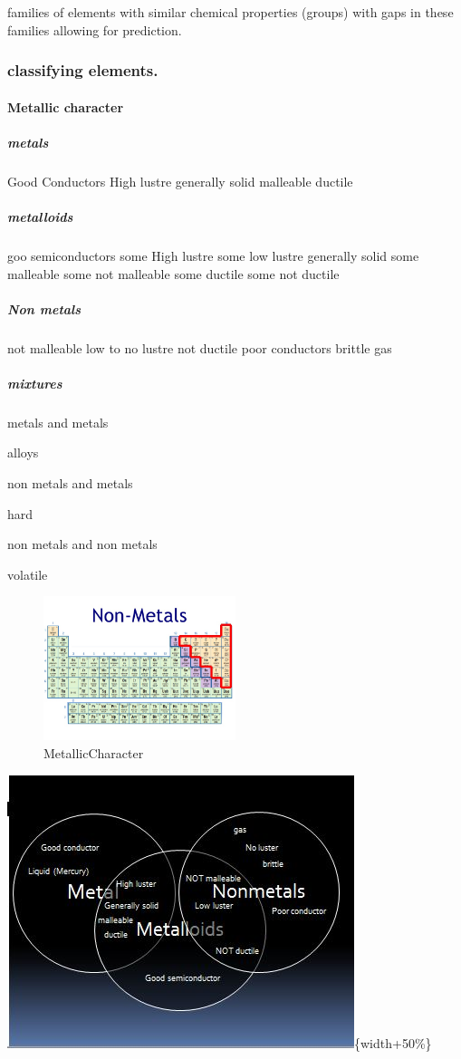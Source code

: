 \documentclass[]{article}
\let\oldparagraph\paragraph
\renewcommand{\paragraph}[1]{\oldparagraph{#1}\mbox{}}
\let\oldsubparagraph\subparagraph
\renewcommand{\subparagraph}[1]{\oldsubparagraph{#1}\mbox{}}
\begin{document}
families of elements with similar chemical properties (groups) with gaps
in these families allowing for prediction.

\subsubsection{classifying elements.}\label{classifying-elements.}

\paragraph{Metallic character}\label{metallic-character}

\subparagraph{metals}\label{metals}

Good Conductors High lustre generally solid malleable ductile

\subparagraph{metalloids}\label{metalloids}

goo semiconductors some High lustre some low lustre generally solid some
malleable some not malleable some ductile some not ductile

\subparagraph{Non metals}\label{non-metals}

not malleable low to no lustre not ductile poor conductors brittle gas

\subparagraph{mixtures}\label{mixtures}

metals and metals

alloys

non metals and metals

hard

non metals and non metals

volatile

\begin{figure}
\centering
\includegraphics[width=0.50000\textwidth]{Images/MetalsPeriodicTable.jpg}
\caption{MetallicCharacter}
\end{figure}

\includegraphics{Images/MetalsVennDiagram.jpg}\{width+50\%\}
\end{document}
